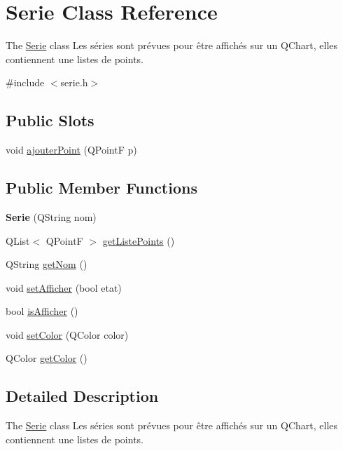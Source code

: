 \hypertarget{classSerie}{\section{Serie Class Reference}
\label{classSerie}
}


The \hyperlink{classSerie}{Serie} class Les séries sont prévues pour être affichés sur un Q\-Chart, elles contiennent une listes de points.  




{\ttfamily \#include $<$serie.\-h$>$}

\subsection*{Public Slots}
\begin{DoxyCompactItemize}
\item 
void \hyperlink{classSerie_a246c3b04192bc305d52ffc81ac5340fc}{ajouter\-Point} (Q\-Point\-F p)
\end{DoxyCompactItemize}
\subsection*{Public Member Functions}
\begin{DoxyCompactItemize}
\item 
\hypertarget{classSerie_a43a2d40ef45b06808c98dae95c191aa4}{{\bfseries Serie} (Q\-String nom)}\label{classSerie_a43a2d40ef45b06808c98dae95c191aa4}

\item 
Q\-List$<$ Q\-Point\-F $>$ \hyperlink{classSerie_a39c068d975a5c0986088cd9575958692}{get\-Liste\-Points} ()
\item 
Q\-String \hyperlink{classSerie_a0d52b14fd375bf668f847cc2a85efa0c}{get\-Nom} ()
\item 
void \hyperlink{classSerie_ae1f94a98b19a9b2c35e83b09f530c7c3}{set\-Afficher} (bool etat)
\item 
bool \hyperlink{classSerie_a7ba8cd41b2fec6c08c1b07338afead8e}{is\-Afficher} ()
\item 
void \hyperlink{classSerie_aaef3d2b7ea671910853c76f5b4a5a899}{set\-Color} (Q\-Color color)
\item 
Q\-Color \hyperlink{classSerie_a85bc1294501423c0b252b0b86b722609}{get\-Color} ()
\end{DoxyCompactItemize}


\subsection{Detailed Description}
The \hyperlink{classSerie}{Serie} class Les séries sont prévues pour être affichés sur un Q\-Chart, elles contiennent une listes de points. 

